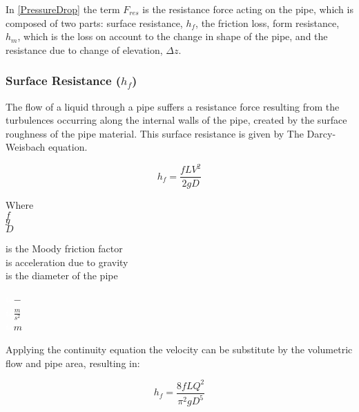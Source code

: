 In \eqref{PressureDrop} the term $F_{res}$ is the resistance force acting on the 
pipe, which is composed of two parts: surface resistance, $h_{f}$, the friction 
loss, form resistance, $h_{m}$, which is the loss on account to the change in 
shape of the pipe, and the resistance due to change of elevation, $\Delta z$. 


\subsubsection{Surface Resistance ($h_f$)} 
The flow of a liquid through a pipe suffers a resistance force resulting from 
the turbulences occurring along the internal walls of the pipe, created by the surface roughness of the pipe material. This surface 
resistance is given by The Darcy-Weisbach equation. 

\begin{equation}
  h_f = \frac{fLV^2}{2gD}
  \label{Darcy}
\end{equation}

 \begin{minipage}[t]{0.20\textwidth}
Where\\
\hspace*{8mm} $f$ \\
\hspace*{8mm} $g$ \\
\hspace*{8mm} $D$ 
\end{minipage}
\begin{minipage}[t]{0.68\textwidth}
\vspace*{2mm}
is the Moody friction factor\\
is acceleration due to gravity\\
is the diameter of the pipe

\end{minipage}
\begin{minipage}[t]{0.10\textwidth}
\vspace*{2mm}
\textcolor{White}{te}$\unit{-}$\\
\textcolor{White}{te}$\unit{\frac{m}{s^2}}$\\
\textcolor{White}{te}$\unit{m}$
\end{minipage}

Applying the continuity equation the velocity can be substitute by the volumetric flow and pipe area, resulting in:

\begin{equation}
  h_f = \frac{8fLQ^2}{\pi^{2}gD^5}
  \label{DarcyWeisbach}
\end{equation} 
 
